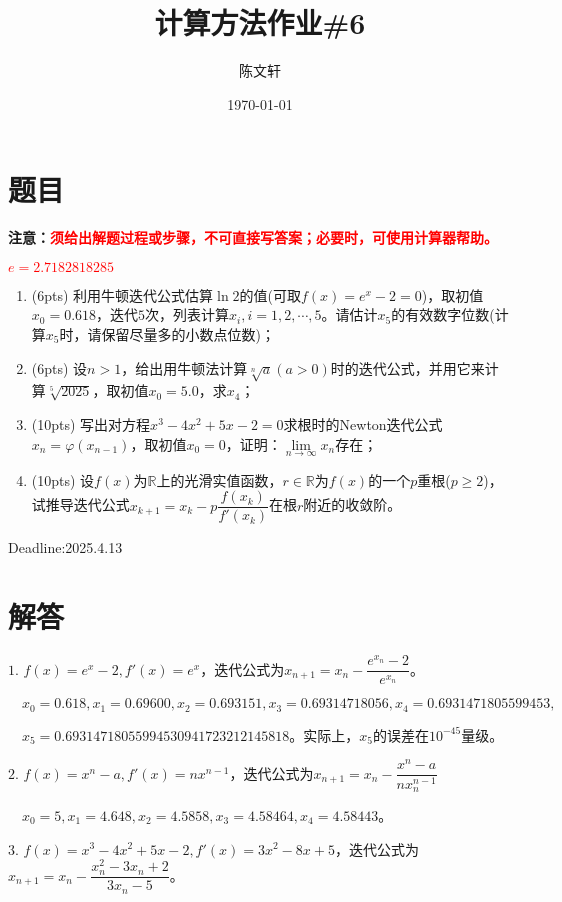 \documentclass[cn,hazy,green,11pt,normal]{elegantnote}
\title{计算方法作业\#6}
\author{陈文轩}
\institute{KFRC}
\date{\today}
\begin{document}
\maketitle

\section{题目}

    \textbf{注意：\textcolor{red}{须给出解题过程或步骤，不可直接写答案；必要时，可使用计算器帮助。}}

    \textcolor{red}{$e=2.7182818285$}
    \begin{enumerate}
        \item (6pts) 利用牛顿迭代公式估算$\ln 2$的值(可取$f(x)=e^x-2=0$)，取初值$x_0=0.618$，迭代$5$次，列表计算$x_i,i=1,2,\cdots,5$。请估计$x_5$的有效数字位数(计算$x_5$时，请保留尽量多的小数点位数)；
        \item (6pts) 设$n>1$，给出用牛顿法计算$\sqrt[n]{a}(a>0)$时的迭代公式，并用它来计算$\sqrt[5]{2025}$，取初值$x_0=5.0$，求$x_4$；
        \item (10pts) 写出对方程$x^3-4x^2+5x-2=0$求根时的Newton迭代公式$x_n=\varphi(x_{n-1})$，取初值$x_0=0$，证明：$\lim\limits_{n\rightarrow\infty}x_n$存在；
        \item (10pts) 设$f(x)$为$\mathbb{R}$上的光滑实值函数，$r\in\mathbb{R}$为$f(x)$的一个$p$重根($p\geq2$)，试推导迭代公式$x_{k+1}=x_k-p\dfrac{f(x_k)}{f'(x_k)}$在根$r$附近的收敛阶。
    \end{enumerate}

    Deadline:2025.4.13

\section{解答}

    $1.\,\,f(x)=e^x-2,f'(x)=e^x$，迭代公式为$x_{n+1}=x_n-\dfrac{e^{x_n}-2}{e^{x_n}}$。

    $\quad x_0=0.618,x_1=0.69600,x_2=0.693151,x_3=0.69314718056,x_4=0.6931471805599453,$

    $\quad x_5=0.69314718055994530941723212145818$。实际上，$x_5$的误差在$10^{-45}$量级。

    $2.\,\,f(x)=x^n-a,f'(x)=nx^{n-1}$，迭代公式为$x_{n+1}=x_n-\dfrac{x^n-a}{nx_n^{n-1}}$

    $\quad x_0=5,x_1=4.648,x_2=4.5858,x_3=4.58464,x_4=4.58443$。

    $3.\,\,f(x)=x^3-4x^2+5x-2,f'(x)=3x^2-8x+5$，迭代公式为$x_{n+1}=x_n-\dfrac{x_n^2-3x_n+2}{3x_n-5}$。
\end{document}
